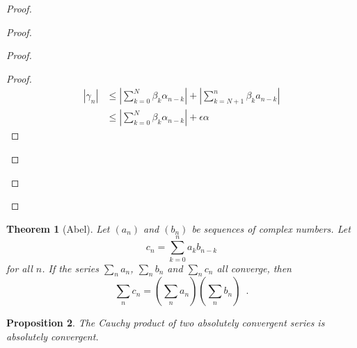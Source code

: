 \documentclass{book}
\let\qed\relax
\newtheorem{prop}{Proposition}[chapter]
\newtheorem{thm}[prop]{Theorem}
\theoremstyle{definition}
\begin{document}
\begin{proof}
\pf
{}
\begin{proof}
	\begin{proof}
		\begin{proof}
			\pf
			\begin{align*}
				|\gamma_n| & \leq \left| \sum_{k=0}^N \beta_k \alpha_{n-k} \right| + \left| \sum_{k=N+1}^n \beta_k a_{n-k} \right| \\
				& \leq \left|\sum_{k=0}^N \beta_k \alpha_{n-k} \right| + \epsilon \alpha
			\end{align*}
		\end{proof}
	\end{proof}
\end{proof}
\qed
\end{proof}

\begin{thm}[Abel]
Let $(a_n)$ and $(b_n)$ be sequences of complex numbers. Let
\[ c_n = \sum_{k=0}^n a_k b_{n-k} \]
for all $n$. If the series $\sum_n a_n$, $\sum_n b_n$ and $\sum_n c_n$ all converge, then
\[ \sum_n c_n = \left( \sum_n a_n \right) \left( \sum_n b_n \right) \enspace . \]
\end{thm}


\begin{prop}
The Cauchy product of two absolutely convergent series is absolutely convergent.
\end{prop}
\end{document}
